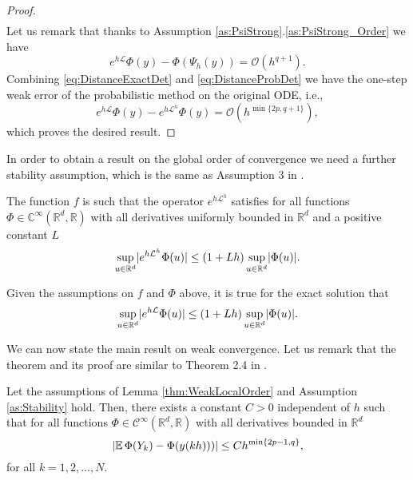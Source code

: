 \documentclass{siamart1116}
\numberwithin{theorem}{section}
\DeclarePairedDelimiter{\abs}{\lvert}{\rvert}
\newcommand{\R}{\mathbb{R}}
\newcommand{\C}{\mathbb{C}}
\newcommand{\OO}{\mathcal{O}}
\newcommand{\diffL}{\mathcal{L}}
\newcommand{\E}{\operatorname{\mathbb{E}}}
\newcommand{\corr}[1]{{\color{bordeaux}#1}}
\begin{document}
\begin{proof}
\begin{equation}
\begin{aligned}
		\end{aligned}
	\end{equation}
	Let us remark that thanks to Assumption \ref{as:PsiStrong}.\ref{as:PsiStrong_Order} we have
	\begin{equation}\label{eq:DistanceExactDet}
		e^{h\diffL}\Phi(y) - \Phi(\Psi_h(y)) = \OO(h^{q+1}).
	\end{equation}
	Combining \eqref{eq:DistanceExactDet} and \eqref{eq:DistanceProbDet} we have the one-step weak error of the probabilistic method on the original ODE, i.e., 
	\begin{equation}\label{eq:LocalWeakError}
		e^{h\diffL}\Phi(y) - e^{h\diffL^h}\Phi(y) = \OO(h^{\min\{2p, q+1\}}),
	\end{equation}
	which proves the desired result.
\end{proof}

In order to obtain a result on the global order of convergence we need a further stability assumption, which is the same as Assumption 3 in \cite{CGS16}.

\begin{assumption}\label{as:Stability} The function $f$ is such that the operator $e^{h\diffL^h}$ satisfies for all functions $\Phi\in\C^{\infty}(\R^d, \R)$ with all derivatives uniformly bounded in $\R^d$ and a positive constant $L$
	\begin{equation}
		\sup_{u\in\R^d} \abs{e^{h\diffL^h}\Phi(u)} \leq (1 + Lh)\sup_{u\in\R^d}\abs{\Phi(u)}.
	\end{equation}
\end{assumption}
\begin{remark} Given the assumptions on $f$ and $\Phi$ above, it is true for the exact solution that
	\begin{equation}
		\sup_{u\in\R^d} \abs{e^{h\diffL}\Phi(u)} \leq (1 + Lh)\sup_{u\in\R^d}\abs{\Phi(u)}.
	\end{equation}
\end{remark}

We can now state the main result on weak convergence. Let us remark that the theorem and its proof are similar to Theorem 2.4 in \cite{CGS16}.

\begin{theorem}\label{thm:weakOrder} Let the assumptions of Lemma \ref{thm:WeakLocalOrder} and Assumption \ref{as:Stability} hold. Then, there exists a constant $C > 0$ independent of $h$ such that for all functions $\Phi \in \mathcal{C}^\infty(\R^d,\R)$ with all derivatives bounded in $\R^d$
	\corr{\begin{equation}
		\abs{\E\Phi(Y_k) - \Phi(y(kh)))} \leq Ch^{\min\{2p - 1, q\}},
	\end{equation}}
	for all $k = 1, 2, \ldots, N$.
\end{theorem}
	
\end{document}
